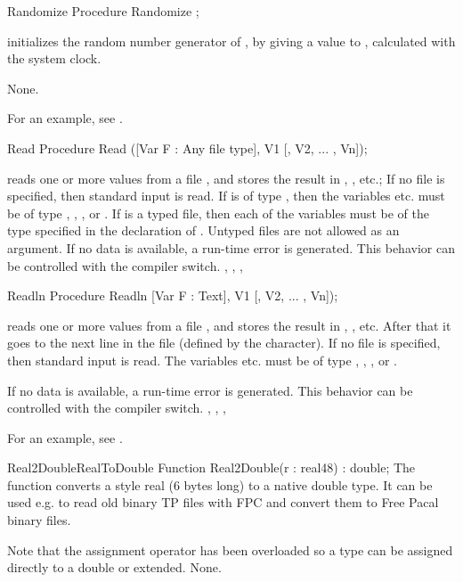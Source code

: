 
\begin{procedure}{Randomize}
\Declaration
Procedure Randomize ;

\Description
{} initializes the random number generator of \fpc, by giving
a value to , calculated with the system clock.

\Errors
None.
\SeeAlso
{}
\end{procedure}
For an example, see .
\begin{procedure}{Read}
\Declaration
Procedure Read ([Var F : Any file type], V1 [, V2, ... , Vn]);

\Description
{} reads one or more values from a file , and stores the
result in , , etc.; If no file  is specified, then
standard input is read.
If  is of type , then the variables  etc. must be
of type , , ,  or .
If  is a typed file, then each of the variables must be of the type
specified in the declaration of . Untyped files are not allowed as an
argument.
\Errors
If no data is available, a run-time error is generated. This behavior can
be controlled with the  compiler switch.
\SeeAlso
{}, , , 
\end{procedure}


\begin{procedure}{Readln}
\Declaration
Procedure Readln [Var F : Text], V1 [, V2, ... , Vn]);

\Description
{} reads one or more values from a file , and stores the
result in , , etc. After that it goes to the next line in
the file (defined by the  character).
If no file  is specified, then standard input is read.
The variables  etc. must be of type , ,
,  or .

\Errors
If no data is available, a run-time error is generated. This behavior can
be controlled with the  compiler switch.
\SeeAlso
{}, , , 
\end{procedure}

For an example, see .

\begin{functionl}{Real2Double}{RealToDouble}
\Declaration
Function Real2Double(r : real48) : double;
\Description
The  function converts a \tp style real (6 bytes long) to
a native \fpc double type. It can be used e.g. to read old binary TP files with
FPC and convert them to Free Pacal binary files.

Note that the assignment operator has been overloaded so a  type
can be assigned directly to a double or extended.
\Errors
None.
\SeeAlso
\end{functionl}

